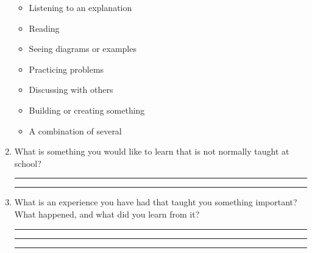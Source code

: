 \begin{multicols}{2}
\begin{enumerate}
		\begin{itemize}[label={$\square$}, leftmargin=2em]
			\item Listening to an explanation
			\item Reading
			\item Seeing diagrams or examples
			\item Practicing problems
			\item Discussing with others
			\item Building or creating something
			\item A combination of several
		\end{itemize}
		
		\item What is something you would like to learn that is not normally taught at school?
		
		\vspace{0.3em}
		\rule{\linewidth}{0.4pt}
		
		\vspace{0.7em}
		\rule{\linewidth}{0.4pt}
		
		\item What is an experience you have had that taught you something important? What happened, and what did you learn from it?
		
		\vspace{0.3em}
		\rule{\linewidth}{0.4pt}
		
		\vspace{0.7em}
		\rule{\linewidth}{0.4pt}
		
		\vspace{0.7em}
		\rule{\linewidth}{0.4pt}
		
	\end{enumerate}
	\end{multicols}
	

